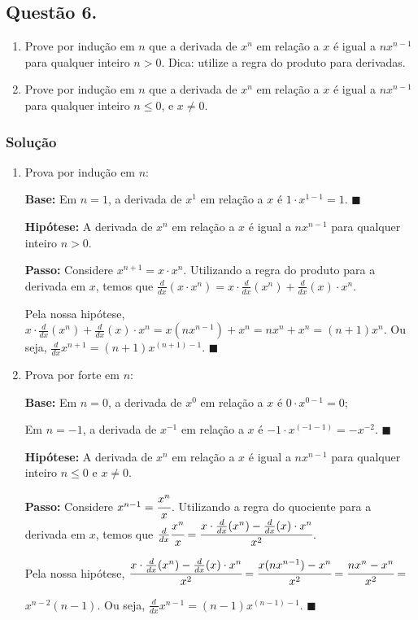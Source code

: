 \documentclass[12pt, letterpaper]{report}
\newcommand*{\CQD}{\hfill\ensuremath{\blacksquare}}%
\newcounter{ProblemNum}
\newcommand*{\anyproblem}[1]{\newpage\subsection*{#1}}
\newcommand*{\problem}[1]{\stepcounter{ProblemNum} %
   \anyproblem{Questão #1}}
\newcommand*{\soln}[1]{\subsubsection*{#1}}
\newcommand*{\solution}{\soln{Solução}}
\begin{document}
\problem{6.}
  \begin{enumerate}[label=\arabic*.]
    \item Prove por indução em $ n $ que a derivada de $ x^n $ em relação a $ x $ é igual a $ nx^{n-1} $ para qualquer inteiro $ n > 0$. Dica: utilize a regra do produto para derivadas.
    \item Prove por indução em $ n $ que a derivada de $ x^n $ em relação a $ x $ é igual a $ nx^{n-1} $ para qualquer inteiro $ n \leq 0 $, e $ x \neq 0 $.
  \end{enumerate}

\solution
  \begin{enumerate}[label=\arabic*.]
    \item Prova por indução em $n$:

    \textbf{Base:} Em $n = 1$, a derivada de $x^1$ em relação a $x$ é $1 \cdot x^{1 - 1} = 1$. \CQD

    \textbf{Hipótese:} A derivada de $ x^n $ em relação a $ x $ é igual a $ nx^{n-1} $ para qualquer inteiro $ n > 0$.

    \textbf{Passo:} Considere $x^{n + 1} = x \cdot x^n$. Utilizando a regra do produto para a derivada em $x$, temos que $\frac{d}{dx} (x \cdot x^n) = x \cdot \frac{d}{dx}(x^n) + \frac{d}{dx}(x) \cdot x^n$.

    Pela nossa hipótese, $x \cdot \frac{d}{dx}(x^n) + \frac{d}{dx}(x) \cdot x^n = x (nx^{n - 1}) + x^n = nx^n + x^n = (n + 1)x^n$. Ou seja, $\frac{d}{dx} x^{n + 1} = (n + 1)x^{(n + 1) - 1}$. \CQD

    \item Prova por forte em $n$:

    \textbf{Base:} Em $n = 0$, a derivada de $x^0$ em relação a $x$ é $0 \cdot x^{0 - 1} = 0$; 

    Em $n = -1$, a derivada de $x^{-1}$ em relação a $x$ é $-1 \cdot x^{(-1 - 1)} = -x^{-2}$. \CQD

    \textbf{Hipótese:} A derivada de $ x^n $ em relação a $ x $ é igual a $ nx^{n-1} $ para qualquer inteiro $ n \leq 0$ e $x \neq 0$.

    \textbf{Passo:} Considere $x^{n - 1} = \cfrac{x^n}{x}$. Utilizando a regra do quociente para a derivada em $x$, temos que $\frac{d}{dx} \cfrac{x^n}{x} = \cfrac{x \cdot \frac{d}{dx}(x^n) - \frac{d}{dx}(x) \cdot x^n}{x^2}$.

    Pela nossa hipótese, $\cfrac{x \cdot \frac{d}{dx}(x^n) - \frac{d}{dx}(x) \cdot x^n}{x^2} = \cfrac{x (nx^{n - 1}) - x^n}{x^2} = \cfrac{nx^n - x^n}{x^2} =$
    
    $x^{n - 2}(n - 1)$. Ou seja, $\frac{d}{dx} x^{n - 1} = (n - 1)x^{(n - 1) - 1}$. \CQD
  \end{enumerate}
\end{document}
